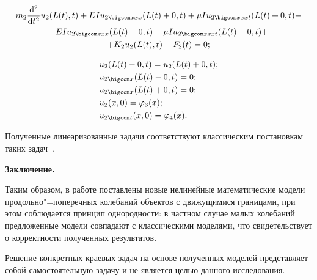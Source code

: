 \vspace{-8mm}



\begin{multline}

m_2\frac{\mathrm{d}^2 }{\mathrm{d}t^2} u_2( L(t), t ) +

EIu_{2 \bigcom xxx}(L(t)+0, t)+\mu Iu_{2 \bigcom xxxt}(L(t)+0, t)-\\

-EIu_{2 \bigcom xxx}(L(t)-0, t)-\mu Iu_{2 \bigcom xxxt}(L(t)-0, t)+ \\ +

K_2u_2( L(t), t )-F_2(t)=0;

\end{multline}

\begin{equation}

\begin{split}

& u_2(L(t)-0, t)=u_2(L(t)+0, t); \\

&  u_{2 \bigcom x}(L(t)-0, t)=0;\\ 

& u_{2 \bigcom x}(L(t)+0, t)=0;\\

& u_2(x, 0)=\varphi_3(x);\\

&  u_{2 \bigcom t}(x, 0)=\varphi_4(x).

\end{split}

\end{equation}



Полученные линеаризованные задачи соответствуют классическим постановкам таких задач~\cite{Anisimov_bib2, Anisimov_bib3, Anisimov_bib4, Anisimov_bib17, Anisimov_bib18}.





\smallskip



\textbf{Заключение.}

Таким образом, в работе поставлены новые нелинейные математические модели продольно"=поперечных колебаний объектов с движущимися границами, при этом соблюдается принцип однородности: в частном случае малых колебаний предложенные модели совпадают с классическими моделями, что свидетельствует о корректности полученных результатов. 

Решение конкретных краевых задач на основе полученных моделей представляет собой самостоятельную задачу и не является целью данного исследования.



